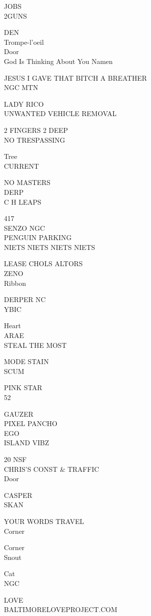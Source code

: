 \documentclass[10pt,letterpaper]{article}
\begin{document}
JOBS\\
2GUNS

DEN\\
Trompe{-}l'oeil\\
Door\\
God Is Thinking About You Namen

JESUS I GAVE THAT BITCH A BREATHER\\
NGC MTN

LADY RICO\\
UNWANTED VEHICLE REMOVAL

2 FINGERS 2 DEEP\\
NO TRESPASSING

Tree\\
CURRENT

NO MASTERS\\
DERP\\
C H LEAPS

417\\
SENZO NGC\\
PENGUIN PARKING\\
NIETS NIETS NIETS NIETS

LEASE CHOLS ALTORS\\
ZENO\\
Ribbon

DERPER NC\\
YBIC

Heart\\
ARAE\\
STEAL THE MOST

MODE STAIN\\
SCUM

PINK STAR\\
52

GAUZER\\
PIXEL PANCHO\\
EGO\\
ISLAND VIBZ

20 NSF\\
CHRIS'S CONST \& TRAFFIC\\
Door

CASPER\\
SKAN

YOUR WORDS TRAVEL\\
Corner

Corner\\
Snout

Cat\\
NGC

LOVE\\
BALTIMORELOVEPROJECT.COM
\end{document}
